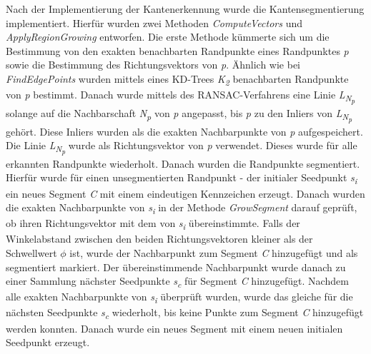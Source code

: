 Nach der Implementierung der Kantenerkennung wurde die Kantensegmentierung implementiert. Hierfür wurden zwei Methoden \textit{ComputeVectors} und \textit{ApplyRegionGrowing} entworfen. Die erste Methode kümmerte sich um die Bestimmung von den exakten benachbarten Randpunkte eines Randpunktes \textit{p} sowie die Bestimmung des Richtungsvektors von \textit{p}. Ähnlich wie bei \textit{FindEdgePoints} wurden mittels eines KD-Trees \textit{K\textsubscript{2}} benachbarten Randpunkte von \textit{p} bestimmt. Danach wurde mittels des RANSAC-Verfahrens eine Linie \textit{L\textsubscript{N\textsubscript{p}}} solange auf die Nachbarschaft \textit{N\textsubscript{p}} von \textit{p} angepasst, bis \textit{p} zu den Inliers von \textit{L\textsubscript{N\textsubscript{p}}} gehört. Diese Inliers wurden als die exakten Nachbarpunkte von \textit{p} aufgespeichert. Die Linie \textit{L\textsubscript{N\textsubscript{p}}} wurde als Richtungsvektor von \textit{p} verwendet. Dieses wurde für alle erkannten Randpunkte wiederholt. Danach wurden die Randpunkte segmentiert. Hierfür wurde für einen unsegmentierten Randpunkt - der initialer Seedpunkt \textit{s\textsubscript{i}} ein neues Segment \textit{C} mit einem eindeutigen Kennzeichen erzeugt. Danach wurden die exakten Nachbarpunkte von \textit{s\textsubscript{i}} in der Methode \textit{GrowSegment} darauf geprüft, ob ihren Richtungsvektor mit dem von \textit{s\textsubscript{i}} übereinstimmte. Falls der Winkelabstand zwischen den beiden Richtungsvektoren kleiner als der Schwellwert \textit{$\phi$} ist, wurde der Nachbarpunkt zum Segment \textit{C} hinzugefügt und als segmentiert markiert. Der übereinstimmende Nachbarpunkt wurde danach zu einer Sammlung nächster Seedpunkte \textit{s\textsubscript{c}} für Segment \textit{C} hinzugefügt. Nachdem alle exakten Nachbarpunkte von \textit{s\textsubscript{i}} überprüft wurden, wurde das gleiche für die nächsten Seedpunkte \textit{s\textsubscript{c}} wiederholt, bis keine Punkte zum Segment \textit{C} hinzugefügt werden konnten. Danach wurde ein neues Segment mit einem neuen initialen Seedpunkt erzeugt.

